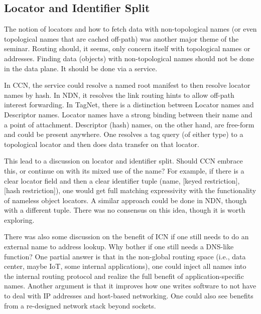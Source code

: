\subsection{Locator and Identifier Split}
The notion of locators and how to fetch data with non-topological names (or
even topological names that are cached off-path) was another major theme of
the seminar. Routing should, it seems, only concern
itself with topological names or addresses. Finding data (objects) with non-topological
names should not be done in the data plane. It should be done via a service.

In CCN, the service could resolve a named root manifest to then resolve locator names by hash.
In NDN, it resolves the link routing hints to allow off-path interest forwarding. In TagNet,
there is a distinction between Locator names and Descriptor names. Locator names have a
strong binding between their name and a point of attachment. Descriptor (hash) names, on the
other hand, are free-form and could be present anywhere.  One resolves a tag query (of either
type) to a topological locator and then does data transfer on that locator.

This lead to a discussion on locator and identifier split.  Should CCN embrace this, or
continue on with its mixed use of the name? For example, if there is a clear locator
field and then a clear identifier tuple (name, [keyed restriction], [hash restriction]),
one would get full matching expressivity with the functionality of nameless object locators.
A similar approach could be done in NDN, though with a different tuple.  There was no
consensus on this idea, though it is worth exploring.

There was also some discussion on the benefit of ICN if one still needs to do an external
name to address lookup.  Why bother if one still needs a DNS-like function?  One partial
answer is that in the non-global routing space (i.e., data center, maybe IoT, some internal
applications), one could inject all names into the internal routing protocol and realize
the full benefit of application-specific names.  Another argument is that it improves
how one writes software to not have to deal with IP addresses and host-based networking.
One could also see benefits from a re-designed network stack beyond sockets.


